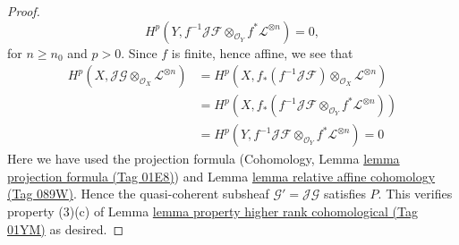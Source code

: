 \documentclass{amsart}
\theoremstyle{plain}
\theoremstyle{definition}
\theoremstyle{remark}
\numberwithin{equation}{subsection}
\begin{document}
\begin{proof}
$$
H^p(Y, f^{-1}\mathcal{J}\mathcal{F}
\otimes_{\mathcal{O}_Y} f^*\mathcal{L}^{\otimes n}) = 0,
$$
for $n \geq n_0$ and $p > 0$. Since $f$ is finite, hence affine, we see that
\begin{align*}
H^p(X, \mathcal{J}\mathcal{G} \otimes_{\mathcal{O}_X}
\mathcal{L}^{\otimes n})
& =
H^p(X, f_*(f^{-1}\mathcal{J}\mathcal{F}) \otimes_{\mathcal{O}_X}
\mathcal{L}^{\otimes n}) \\
& =
H^p(X, f_*(f^{-1}\mathcal{J}\mathcal{F} \otimes_{\mathcal{O}_Y}
f^*\mathcal{L}^{\otimes n})) \\
& =
H^p(Y, f^{-1}\mathcal{J}\mathcal{F} \otimes_{\mathcal{O}_Y}
f^*\mathcal{L}^{\otimes n}) = 0
\end{align*}
Here we have used the projection formula
(Cohomology, Lemma \href{https://stacks.math.columbia.edu/tag/01E8}{lemma projection formula (Tag 01E8)}) and
Lemma \href{https://stacks.math.columbia.edu/tag/089W}{lemma relative affine cohomology (Tag 089W)}.
Hence the quasi-coherent subsheaf $\mathcal{G}' = \mathcal{J}\mathcal{G}$
satisfies $P$. This verifies property (3)(c) of
Lemma \href{https://stacks.math.columbia.edu/tag/01YM}{lemma property higher rank cohomological (Tag 01YM)} as desired.
\end{proof}
\end{document}
